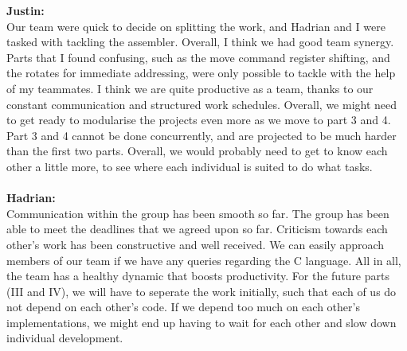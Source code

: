 \documentclass[a4paper]{article}
\begin{document}
\textbf{Justin:}\\
Our team were quick to decide on splitting the work, and Hadrian and I were tasked with tackling the assembler. Overall, I think we had good team synergy. Parts that I found confusing, such as the move command register shifting, and the rotates for immediate addressing, were only possible to tackle with the help of my teammates. I think we are quite productive as a team, thanks to our constant communication and structured work schedules. Overall, we might need to get ready to modularise the projects even more as we move to part 3 and 4. Part 3 and 4 cannot be done concurrently, and are projected to be much harder than the first two parts. Overall, we would probably need to get to know each other a little more, to see where each individual is suited to do what tasks.\\
\\
\textbf{Hadrian:}\\
Communication within the group has been smooth so far. The group has been able to meet the deadlines that we agreed upon so far. Criticism towards each other's work has been constructive and well received. We can easily approach members of our team if we have any queries regarding the C language. All in all, the team has a healthy dynamic that boosts productivity. For the future parts (III and IV), we will have to seperate the work initially, such that each of us do not depend on each other's code. If we depend too much on each other's implementations, we might end up having to wait for each other and slow down individual development.
\end{document}
